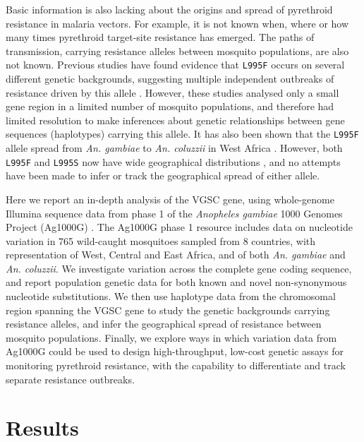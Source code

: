 \documentclass[a4paper,11pt,abstracton,hidelinks]{scrartcl}
\begin{document}
Basic information is also lacking about the origins and spread of pyrethroid resistance in malaria vectors. 	
%
For example, it is not known when, where or how many times pyrethroid target-site resistance has emerged. 
%
The paths of transmission, carrying resistance alleles between mosquito populations, are also not known. 
%
Previous studies have found evidence that \texttt{L995F} occurs on several different genetic backgrounds, suggesting multiple independent outbreaks of resistance driven by this allele \cite{Pinto2007,Etang2009,Santolamazza2015}. 
%
However, these studies analysed only a small gene region in a limited number of mosquito populations, and therefore had limited resolution to make inferences about genetic relationships between gene sequences (haplotypes) carrying this allele. 
%
It has also been shown that the \texttt{L995F} allele spread from \textit{An. gambiae} to \textit{An. coluzzii} in West Africa \cite{Clarkson2014,Norris2015}. 
%
However, both \texttt{L995F} and \texttt{L995S} now have wide geographical distributions \cite{Silva2014}, and no attempts have been made to infer or track the geographical spread of either allele.

Here we report an in-depth analysis of the VGSC gene, using whole-genome Illumina sequence data from phase 1 of the \emph{Anopheles gambiae} 1000 Genomes Project (Ag1000G) \cite{Ag1000gConsortium2017}.
%
The Ag1000G phase 1 resource includes data on nucleotide variation in 765 wild-caught mosquitoes sampled from 8 countries, with representation of West, Central and East Africa, and of both \textit{An. gambiae} and \textit{An. coluzzii}.
%
We investigate variation across the complete gene coding sequence, and report population genetic data for both known and novel non-synonymous nucleotide substitutions.
%
We then use haplotype data from the chromosomal region spanning the VGSC gene to study the genetic backgrounds carrying resistance alleles, and infer the geographical spread of resistance between mosquito populations.
%
Finally, we explore ways in which variation data from Ag1000G could be used to design high-throughput, low-cost genetic assays for monitoring pyrethroid resistance, with the capability to differentiate and track separate resistance outbreaks.  




\section*{Results}
\end{document}
